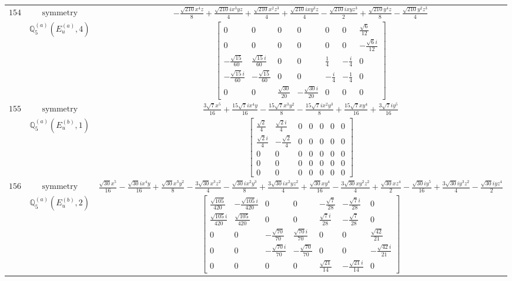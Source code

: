 \documentclass[fleqn,8pt,landscape]{jsarticle}
\begin{document}
\begin{longtable}{ccc}
$ 154 $ & $ \text{symmetry} $ & $ - \frac{\sqrt{210} x^{4} z}{8} + \frac{\sqrt{210} i x^{3} y z}{4} + \frac{\sqrt{210} x^{2} z^{3}}{4} + \frac{\sqrt{210} i x y^{3} z}{4} - \frac{\sqrt{210} i x y z^{3}}{2} + \frac{\sqrt{210} y^{4} z}{8} - \frac{\sqrt{210} y^{2} z^{3}}{4} $ \\
$  $ & $ \mathbb{Q}_{5}^{(a)}(E_{u}^{(a)},4) $ & $ \begin{bmatrix} 0 & 0 & 0 & 0 & 0 & 0 & \frac{\sqrt{6}}{12} \\ 0 & 0 & 0 & 0 & 0 & 0 & - \frac{\sqrt{6} i}{12} \\ - \frac{\sqrt{15}}{60} & \frac{\sqrt{15} i}{60} & 0 & 0 & \frac{1}{4} & - \frac{i}{4} & 0 \\ - \frac{\sqrt{15} i}{60} & - \frac{\sqrt{15}}{60} & 0 & 0 & - \frac{i}{4} & - \frac{1}{4} & 0 \\ 0 & 0 & \frac{\sqrt{30}}{20} & - \frac{\sqrt{30} i}{20} & 0 & 0 & 0 \end{bmatrix} $ \\ \hline
$ 155 $ & $ \text{symmetry} $ & $ \frac{3 \sqrt{7} x^{5}}{16} + \frac{15 \sqrt{7} i x^{4} y}{16} - \frac{15 \sqrt{7} x^{3} y^{2}}{8} - \frac{15 \sqrt{7} i x^{2} y^{3}}{8} + \frac{15 \sqrt{7} x y^{4}}{16} + \frac{3 \sqrt{7} i y^{5}}{16} $ \\
$  $ & $ \mathbb{Q}_{5}^{(a)}(E_{u}^{(b)},1) $ & $ \begin{bmatrix} \frac{\sqrt{2}}{4} & \frac{\sqrt{2} i}{4} & 0 & 0 & 0 & 0 & 0 \\ \frac{\sqrt{2} i}{4} & - \frac{\sqrt{2}}{4} & 0 & 0 & 0 & 0 & 0 \\ 0 & 0 & 0 & 0 & 0 & 0 & 0 \\ 0 & 0 & 0 & 0 & 0 & 0 & 0 \\ 0 & 0 & 0 & 0 & 0 & 0 & 0 \end{bmatrix} $ \\ \hline
$ 156 $ & $ \text{symmetry} $ & $ \frac{\sqrt{30} x^{5}}{16} - \frac{\sqrt{30} i x^{4} y}{16} + \frac{\sqrt{30} x^{3} y^{2}}{8} - \frac{3 \sqrt{30} x^{3} z^{2}}{4} - \frac{\sqrt{30} i x^{2} y^{3}}{8} + \frac{3 \sqrt{30} i x^{2} y z^{2}}{4} + \frac{\sqrt{30} x y^{4}}{16} - \frac{3 \sqrt{30} x y^{2} z^{2}}{4} + \frac{\sqrt{30} x z^{4}}{2} - \frac{\sqrt{30} i y^{5}}{16} + \frac{3 \sqrt{30} i y^{3} z^{2}}{4} - \frac{\sqrt{30} i y z^{4}}{2} $ \\
$  $ & $ \mathbb{Q}_{5}^{(a)}(E_{u}^{(b)},2) $ & $ \begin{bmatrix} \frac{\sqrt{105}}{420} & - \frac{\sqrt{105} i}{420} & 0 & 0 & - \frac{\sqrt{7}}{28} & - \frac{\sqrt{7} i}{28} & 0 \\ \frac{\sqrt{105} i}{420} & \frac{\sqrt{105}}{420} & 0 & 0 & \frac{\sqrt{7} i}{28} & - \frac{\sqrt{7}}{28} & 0 \\ 0 & 0 & - \frac{\sqrt{70}}{70} & \frac{\sqrt{70} i}{70} & 0 & 0 & \frac{\sqrt{42}}{21} \\ 0 & 0 & - \frac{\sqrt{70} i}{70} & - \frac{\sqrt{70}}{70} & 0 & 0 & - \frac{\sqrt{42} i}{21} \\ 0 & 0 & 0 & 0 & \frac{\sqrt{21}}{14} & - \frac{\sqrt{21} i}{14} & 0 \end{bmatrix} $ \\ \hline

\end{longtable}
\end{document}
